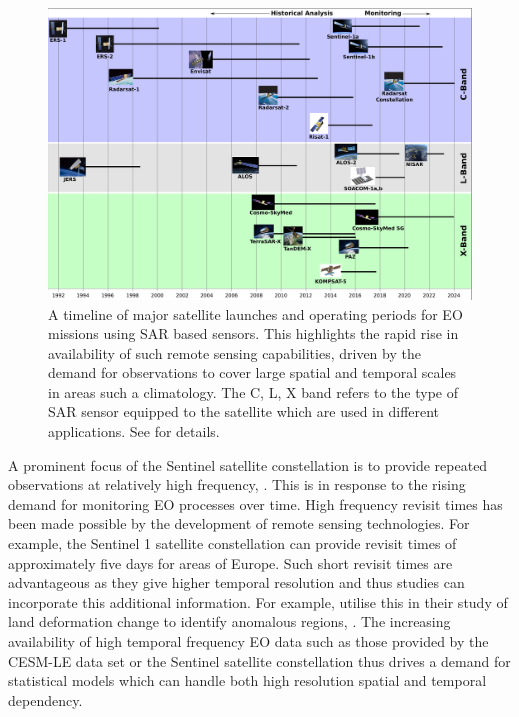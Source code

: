 \begin{figure}[htbp!] 
	\centering    
	\includegraphics[width=1.0\textwidth]{Sensors}
	\caption[Timeline of major EO satellites]{A timeline of major satellite launches and operating periods for EO missions using SAR based sensors. This highlights the rapid rise in availability of such remote sensing capabilities, driven by the demand for observations to cover large spatial and temporal scales in areas such a climatology. The C, L, X band refers to the type of SAR sensor equipped to the satellite which are used in different applications. See \citep{oliver_understanding_2004} for details.}
	\label{fig:sar_timeline}
\end{figure}

A prominent focus of the Sentinel satellite constellation is to provide repeated observations at relatively high frequency, \cite{aschbacher_european_2012}.
This is in response to the rising demand for monitoring EO processes over time.
High frequency revisit times has been made possible by the development of remote sensing technologies.
For example, the Sentinel 1 satellite constellation can provide revisit times of approximately five days for areas of Europe.
Such short revisit times are advantageous as they give higher temporal resolution and thus studies can incorporate this additional information.
For example, \citeauthor{raspini_continuous_2018} utilise this in their study of land deformation change to identify anomalous regions, \citep{raspini_continuous_2018}.
The increasing availability of high temporal frequency EO data such as those provided by the CESM-LE data set or the Sentinel satellite constellation thus drives a demand for statistical models which can handle both high resolution spatial and temporal dependency.  

